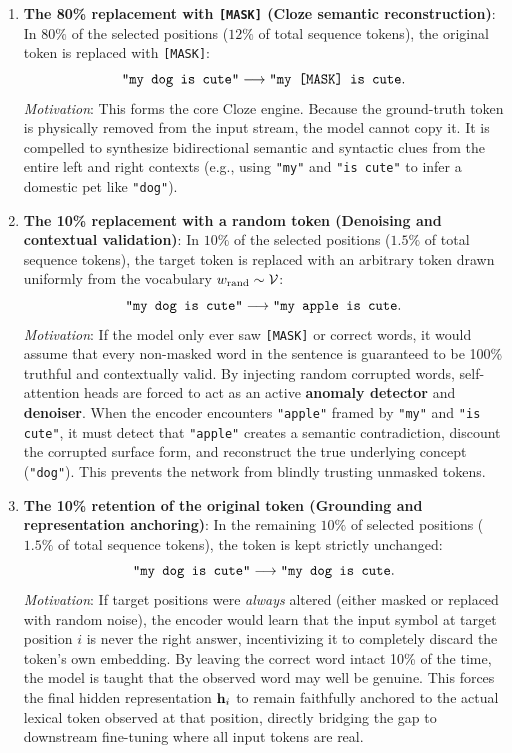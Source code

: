 \documentclass[../../main.tex]{subfiles}
\begin{document}
\begin{enumerate}
    \item \textbf{The 80\% replacement with \texttt{[MASK]} (Cloze semantic reconstruction)}:
    In $80\%$ of the selected positions ($12\%$ of total sequence tokens), the original token is replaced with \texttt{[MASK]}:
    $$\text{\texttt{"my dog is cute"}} \longrightarrow \text{\texttt{"my [MASK] is cute}}.$$
    \emph{Motivation}: This forms the core Cloze engine. Because the ground-truth token is physically removed from the input stream, the model cannot copy it. It is compelled to synthesize bidirectional semantic and syntactic clues from the entire left and right contexts (e.g., using \texttt{"my"} and \texttt{"is cute"} to infer a domestic pet like \texttt{"dog"}).

    \item \textbf{The 10\% replacement with a random token (Denoising and contextual validation)}:
    In $10\%$ of the selected positions ($1.5\%$ of total sequence tokens), the target token is replaced with an arbitrary token drawn uniformly from the vocabulary $w_{\text{rand}} \sim \mathcal{V}$:
    $$\text{\texttt{"my dog is cute"}} \longrightarrow \text{\texttt{"my apple is cute}}.$$
    \emph{Motivation}: If the model only ever saw \texttt{[MASK]} or correct words, it would assume that every non-masked word in the sentence is guaranteed to be 100\% truthful and contextually valid. By injecting random corrupted words, self-attention heads are forced to act as an active \textbf{anomaly detector} and \textbf{denoiser}. When the encoder encounters \texttt{"apple"} framed by \texttt{"my"} and \texttt{"is cute"}, it must detect that \texttt{"apple"} creates a semantic contradiction, discount the corrupted surface form, and reconstruct the true underlying concept (\texttt{"dog"}). This prevents the network from blindly trusting unmasked tokens.

    \item \textbf{The 10\% retention of the original token (Grounding and representation anchoring)}:
    In the remaining $10\%$ of selected positions ($1.5\%$ of total sequence tokens), the token is kept strictly unchanged:
    $$\text{\texttt{"my dog is cute"}} \longrightarrow \text{\texttt{"my dog is cute}}.$$
    \emph{Motivation}: If target positions were \emph{always} altered (either masked or replaced with random noise), the encoder would learn that the input symbol at target position $i$ is never the right answer, incentivizing it to completely discard the token's own embedding. By leaving the correct word intact 10\% of the time, the model is taught that the observed word may well be genuine. This forces the final hidden representation $\mathbf{h}_i$ to remain faithfully anchored to the actual lexical token observed at that position, directly bridging the gap to downstream fine-tuning where all input tokens are real.
\end{enumerate}
\end{document}
